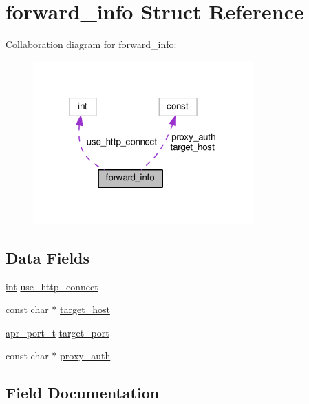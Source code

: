 \hypertarget{structforward__info}{}\section{forward\+\_\+info Struct Reference}
\label{structforward__info}


Collaboration diagram for forward\+\_\+info\+:
\nopagebreak
\begin{figure}[H]
\begin{center}
\leavevmode
\includegraphics[width=241pt]{structforward__info__coll__graph}
\end{center}
\end{figure}
\subsection*{Data Fields}
\begin{DoxyCompactItemize}
\item 
\hyperlink{pcre_8txt_a42dfa4ff673c82d8efe7144098fbc198}{int} \hyperlink{structforward__info_a2470d137feb904af212a5d9e524d5d3a}{use\+\_\+http\+\_\+connect}
\item 
const char $\ast$ \hyperlink{structforward__info_aead08ba3b9577d3735a465be340dbea7}{target\+\_\+host}
\item 
\hyperlink{group__apr__network__io_gaa670a71960f6eb4fe0d0de2a1e7aba03}{apr\+\_\+port\+\_\+t} \hyperlink{structforward__info_a8869e21f61a36353e6a0e56e56d54d11}{target\+\_\+port}
\item 
const char $\ast$ \hyperlink{structforward__info_a8d2838aa6f8c5f477a3403c3ff404c3a}{proxy\+\_\+auth}
\end{DoxyCompactItemize}


\subsection{Field Documentation}
